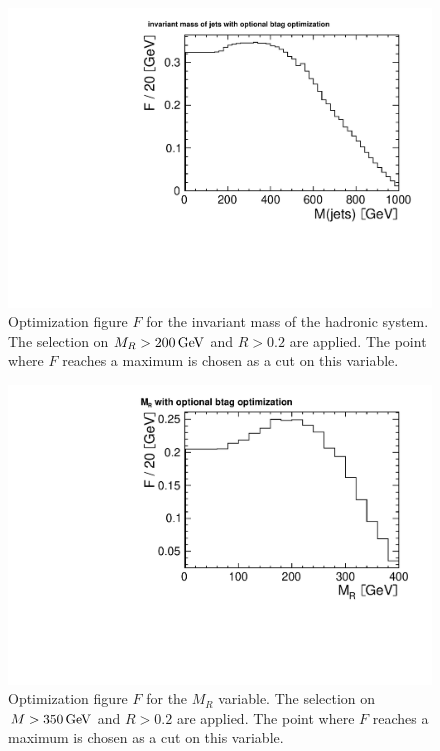 \begin{figure}[phtb]
    \centering
    \includegraphics[width=.7\textwidth]{images/pdf/cut_opt_had_mass_optional_btag_4jets_AND_mr200_AND_r02}
    \caption{Optimization figure $F$ for the invariant mass of the hadronic
        system. The selection on $M_R > \unit[200]{GeV}$ and $R > 0.2$ are
    applied. The point where $F$ reaches a maximum is chosen as a cut on this variable.}
    \label{fig:opt_had_mass}
\end{figure}
\begin{figure}[phtb]
    \centering
    \includegraphics[width=.7\textwidth]{images/pdf/cut_opt_mr_optional_btag_4jets_AND_r02_AND_had_mass350}
    \caption{Optimization figure $F$ for the $M_R$ variable. The selection
        on $M > \unit[350]{GeV}$ and $R > 0.2$ are
    applied. The point where $F$ reaches a maximum is chosen as a cut on this variable.}
    \label{fig:opt_mr}
\end{figure}

